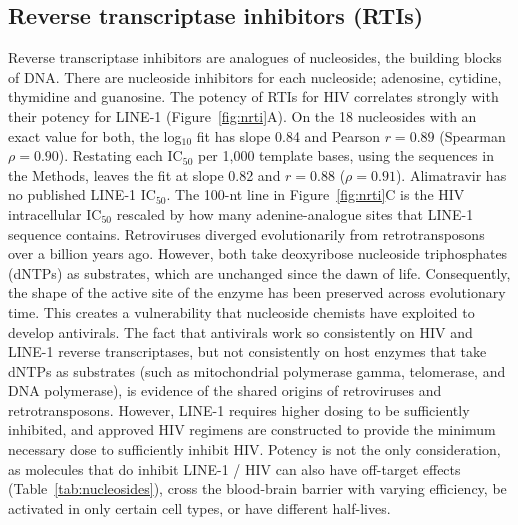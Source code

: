 \documentclass[11pt,twocolumn,twoside]{extarticle}
\begin{document}
\subsection{Reverse transcriptase inhibitors (RTIs)}
Reverse transcriptase inhibitors are analogues of nucleosides, the building blocks of DNA. There are nucleoside inhibitors for each nucleoside; adenosine, cytidine, thymidine and guanosine. The potency of RTIs for HIV correlates strongly with their potency for LINE-1 (Figure~\ref{fig:nrti}A). On the 18 nucleosides with an exact value for both, the log$_{10}$ fit has slope 0.84 and Pearson $r = 0.89$ (Spearman $\rho = 0.90$). Restating each IC$_{50}$ per 1,000 template bases, using the sequences in the Methods, leaves the fit at slope 0.82 and $r = 0.88$ ($\rho = 0.91$). Alimatravir has no published LINE-1 IC$_{50}$. The 100-nt line in Figure~\ref{fig:nrti}C is the HIV intracellular IC$_{50}$ rescaled by how many adenine-analogue sites that LINE-1 sequence contains. Retroviruses diverged evolutionarily from retrotransposons over a billion years ago\cite{aiewsakun}. However, both take deoxyribose nucleoside triphosphates (dNTPs) as substrates, which are unchanged since the dawn of life. Consequently, the shape of the active site of the enzyme has been preserved across evolutionary time\cite{baldwin}. This creates a vulnerability that nucleoside chemists have exploited to develop antivirals. The fact that antivirals work so consistently on HIV and LINE-1 reverse transcriptases, but not consistently on host enzymes that take dNTPs as substrates (such as mitochondrial polymerase gamma, telomerase, and DNA polymerase), is evidence of the shared origins of retroviruses and retrotransposons. However, LINE-1 requires higher dosing to be sufficiently inhibited, and approved HIV regimens are constructed to provide the minimum necessary dose to sufficiently inhibit HIV. Potency is not the only consideration, as molecules that do inhibit LINE-1 / HIV can also have off-target effects (Table~\ref{tab:nucleosides}), cross the blood-brain barrier with varying efficiency, be activated in only certain cell types, or have different half-lives.
\end{document}
